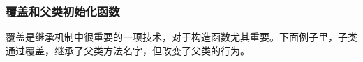 











\subsubsection{覆盖和父类初始化函数}
覆盖是继承机制中很重要的一项技术，对于构造函数尤其重要。下面例子里，子类通过覆盖，继承了父类方法名字，但改变了父类的行为。

